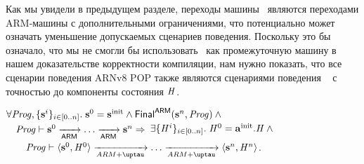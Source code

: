 Как мы увидели в предыдущем разделе, переходы машины \ARMt~являются
переходами ARM-машины с дополнительными ограничениями, что
потенциально может означать уменьшение допускаемых сценариев поведения.
Поскольку это бы означало, что мы не смогли бы использовать \ARMt~как промежуточную
машину в нашем доказательстве корректности компиляции,
нам нужно показать, что все сценарии поведения ARNv8 POP также являются сценариями
поведения \ARMt~ с точностью до компоненты состояния $\mathit{H}$.
\begin{theorem}
  \label{thm:armvpop:armt:sim}
$\forall \mathit{Prog}, \{\mathbf{s}^i\}_{i \in [0..n]}.\; \mathbf{s}^0 = \mathbf{s}^{\rm init}  \land \mathsf{Final}^{\mathsf{ARM}}(\mathbf{s}^n, \mathit{Prog}) \land{}$ \\
${} \quad \mathit{Prog} \vdash \mathbf{s}^0 \xrightarrow[\mathsf{ARM}]{} \dots \xrightarrow[\mathsf{ARM}]{} \mathbf{s}^n \Rightarrow$
$\exists \{\mathit{H}^i\}_{i \in [0..n]}. \; \mathit{H}^0 = \mathbf{a}^{\rm init}.\mathit{H} \land {}$ \\
${} \qquad \Cfarm \vdash \angled{\s^0, \hmap^0} \armStep \dots \armStep \angled{\s^n, \hmap^n}$.
\end{theorem}
